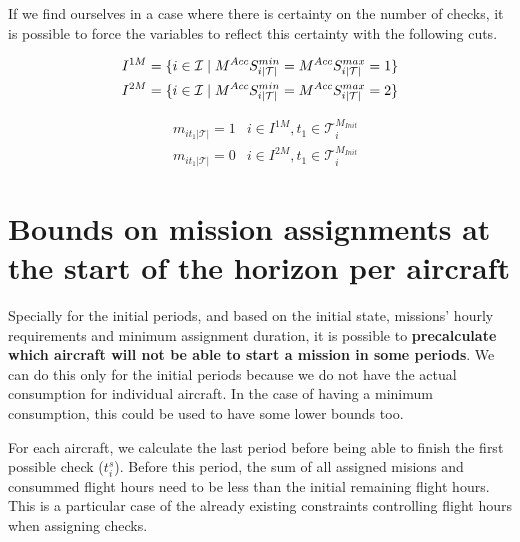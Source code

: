\documentclass[a4paper,onecolumn,fleqn]{article}
\begin{document}
   If we find ourselves in a case where there is certainty on the number of checks, it is possible to force the variables to reflect this certainty with the following cuts.

  \begin{align}
    & I^{1M} = \{i \in \mathcal{I} \mid M^{Acc}S^{min}_{i|\mathcal{T}|} = M^{Acc}S^{max}_{i|\mathcal{T}|} = 1\} \notag \\
    & I^{2M} = \{i \in \mathcal{I} \mid M^{Acc}S^{min}_{i|\mathcal{T}|} = M^{Acc}S^{max}_{i|\mathcal{T}|} = 2\} \notag
  \end{align}

  \begin{align}
    & m_{it_1|\mathcal{T}|} =  1
      & i \in I^{1M}, t_1 \in \mathcal{T}^{M_{Init}}_i \\
    & m_{it_1|\mathcal{T}|} =  0
      & i \in I^{2M}, t_1 \in \mathcal{T}^{M_{Init}}_i
  \end{align}


\section{Bounds on mission assignments at the start of the horizon per aircraft} \label{mission-assignment-for-initial-periods}

  Specially for the initial periods, and based on the initial state, missions' hourly requirements and minimum assignment duration, it is possible to \textbf{precalculate which aircraft will not be able to start a mission in some periods}. We can do this only for the initial periods because we do not have the actual consumption for individual aircraft.  In the case of having a minimum consumption, this could be used to have some lower bounds too. 

  For each aircraft, we calculate the last period before being able to finish the first possible check ($t^{s}_i$). Before this period, the sum of all assigned misions and consummed flight hours need to be less than the initial remaining flight hours. This is a particular case of the already existing constraints controlling flight hours when assigning checks.
\end{document}
